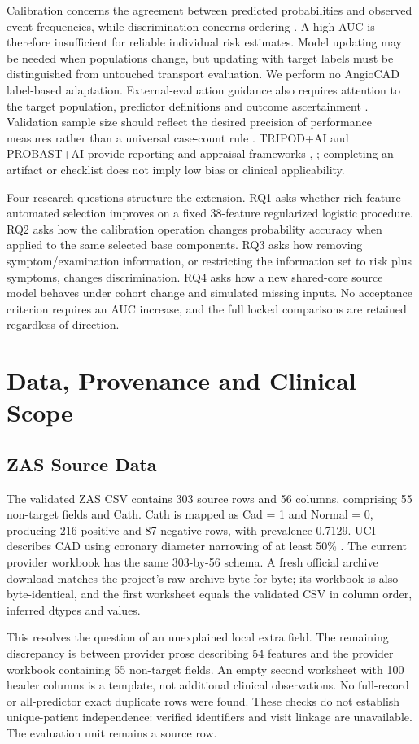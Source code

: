 \documentclass[conference]{IEEEtran}
\begin{document}
Calibration concerns the agreement between predicted probabilities and observed event frequencies, while discrimination concerns ordering \cite{r5}. A high AUC is therefore insufficient for reliable individual risk estimates. Model updating may be needed when populations change, but updating with target labels must be distinguished from untouched transport evaluation. We perform no AngioCAD label-based adaptation. External-evaluation guidance also requires attention to the target population, predictor definitions and outcome ascertainment \cite{r8}. Validation sample size should reflect the desired precision of performance measures rather than a universal case-count rule \cite{r9}. TRIPOD+AI and PROBAST+AI provide reporting and appraisal frameworks \cite{r6}, \cite{r7}; completing an artifact or checklist does not imply low bias or clinical applicability.

Four research questions structure the extension. RQ1 asks whether rich-feature automated selection improves on a fixed 38-feature regularized logistic procedure. RQ2 asks how the calibration operation changes probability accuracy when applied to the same selected base components. RQ3 asks how removing symptom/examination information, or restricting the information set to risk plus symptoms, changes discrimination. RQ4 asks how a new shared-core source model behaves under cohort change and simulated missing inputs. No acceptance criterion requires an AUC increase, and the full locked comparisons are retained regardless of direction.

\section{Data, Provenance and Clinical Scope}
\subsection{ZAS Source Data}
The validated ZAS CSV contains 303 source rows and 56 columns, comprising 55 non-target fields and Cath. Cath is mapped as Cad = 1 and Normal = 0, producing 216 positive and 87 negative rows, with prevalence 0.7129. UCI describes CAD using coronary diameter narrowing of at least 50\% \cite{r3}. The current provider workbook has the same 303-by-56 schema. A fresh official archive download matches the project's raw archive byte for byte; its workbook is also byte-identical, and the first worksheet equals the validated CSV in column order, inferred dtypes and values.

This resolves the question of an unexplained local extra field. The remaining discrepancy is between provider prose describing 54 features and the provider workbook containing 55 non-target fields. An empty second worksheet with 100 header columns is a template, not additional clinical observations. No full-record or all-predictor exact duplicate rows were found. These checks do not establish unique-patient independence: verified identifiers and visit linkage are unavailable. The evaluation unit remains a source row.
\end{document}
